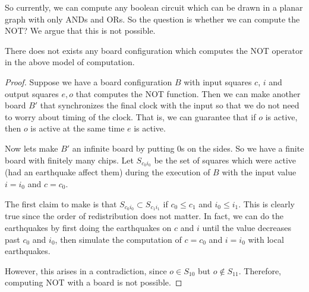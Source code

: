 \documentclass[runningheads,a4paper]{llncs}
\begin{document}
So currently, we can compute any boolean circuit which can be drawn in a planar graph with only ANDs and ORs. So the question is whether we can compute the NOT? We argue that this is not possible. 

\begin{theorem}
There does not exists any board configuration which computes the NOT operator in the above model of computation.
\end{theorem}

\begin{proof}
Suppose we have a board configuration $B$ with input squares $c$, $i$ and output squares $e, o$ that computes the NOT function. Then we can make another board $B'$ that synchronizes the final clock with the input so that we do not need to worry about timing of the clock. That is, we can guarantee that if $o$ is active, then $o$ is active at the same time $e$ is active.

Now lets make $B'$ an infinite board by putting 0s on the sides. So we have a finite board with finitely many chips. Let $S_{c_0i_0}$ be the set of squares which were active (had an earthquake affect them) during the execution of $B$ with the input value $i = i_0$ and $c = c_0$. 

The first claim to make is that $S_{c_0i_0} \subset S_{c_1i_1}$ if $c_0 \leq c_1$ and $i_0 \leq i_1$. This is clearly true since the order of redistribution does not matter. In fact, we can do the earthquakes by first doing the earthquakes on $c$ and $i$ until the value decreases past $c_0$ and $i_0$, then simulate the computation of $c = c_0$ and $i = i_0$ with local earthquakes.

However, this arises in a contradiction, since $o \in S_{10}$ but $o \notin S_{11}$. Therefore, computing NOT with a board is not possible.
\end{proof}
\end{document}
